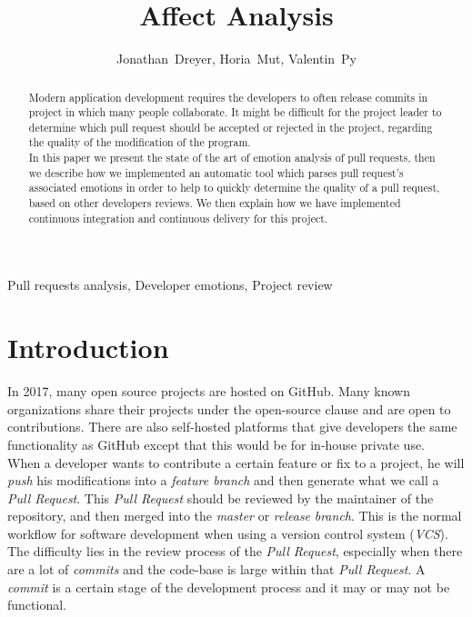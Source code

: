 \documentclass[journal]{IEEEtran}
\begin{document}
\title{Affect Analysis}

\author{Jonathan~Dreyer, Horia~Mut, Valentin~Py}


\maketitle


\begin{abstract}
Modern application development requires the developers to often release commits in project in which many people collaborate. It might be difficult for the project leader to determine which pull request should be accepted or rejected in the project, regarding the quality of the modification of the program.\\

In this paper we present the state of the art of emotion analysis of pull requests, then we describe how we implemented an automatic tool which parses pull request's associated emotions in order to help to quickly determine the quality of a pull request, based on other developers reviews. We then explain how we have implemented continuous integration and continuous delivery for this project.
\end{abstract}

\begin{IEEEkeywords}
Pull requests analysis, Developer emotions, Project review
\end{IEEEkeywords}


\section{Introduction}
In 2017, many open source projects are hosted on GitHub. Many known organizations share their projects under the open-source clause and are open to contributions. There are also self-hosted platforms that give developers the same functionality as GitHub except that this would be for in-house private use.\\

When a developer wants to contribute a certain feature or fix to a project, he will \emph{push} his modifications into a \emph{feature branch} and then generate what we call a \emph{Pull Request}. This \emph{Pull Request} should be reviewed by the maintainer of the repository, and then merged into the \emph{master} or \emph{release} \emph{branch}. This is the normal workflow for software development when using a version control system (\emph{VCS}). The difficulty lies in the review process of the \emph{Pull Request}, especially when there are a lot of \emph{commits} and the code-base is large within that \emph{Pull Request}. A \emph{commit} is a certain stage of the development process and it may or may not be functional.
\end{document}
